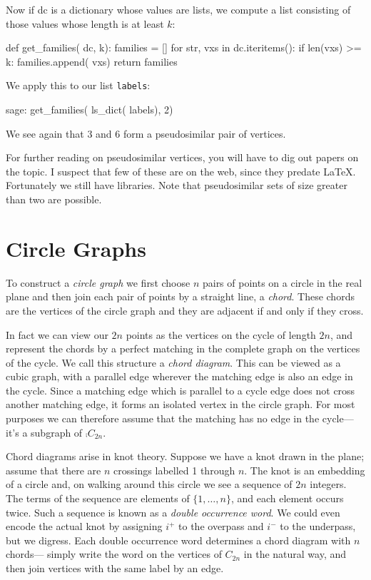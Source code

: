 Now if dc is a dictionary whose values are lists, we compute a list consisting
of those values whose length is at least $k$:
\begin{sageblock}
def get_families( dc, k):
    families = []
    for str, vxs in dc.iteritems():
        if len(vxs) >= k:
            families.append( vxs)
    return families
\end{sageblock}

We apply this to our list \texttt{labels}:
\begin{sageexample}
    sage: get_families( ls_dict( labels), 2)
\end{sageexample}

We see again that 3 and 6 form a pseudosimilar pair of vertices.

For further reading on pseudosimilar vertices, you will have to dig out papers
on the topic.  I suspect that few of these are on the web, since they
predate LaTeX.  Fortunately we still have libraries. Note that pseudosimilar
sets of size greater than two are possible.


\section{Circle Graphs}

To construct a \textsl{circle graph} we first choose $n$ pairs of points on a 
circle in the real plane and then join each pair of points by a straight line,
a \textsl{chord}. These chords are the vertices of the circle graph and they
are adjacent if and only if they cross.

In fact we can view our $2n$ points as the vertices on the cycle of length
$2n$, and represent the chords by a perfect matching in the complete graph
on the vertices of the cycle. We call this structure a \textsl{chord diagram}.
This can be viewed as a cubic graph, with a parallel edge wherever the matching
edge is also an edge in the cycle.
Since a matching edge which is parallel to a cycle edge does not cross
another matching edge, it forms an isolated vertex in the circle
graph. For most purposes we can therefore assume that the matching has
no edge in the cycle---it's a subgraph of $\comp{C_{2n}}$.

Chord diagrams arise in knot theory. Suppose we have a knot drawn in the
plane; assume that there are $n$ crossings labelled 1 through $n$. The knot is 
an embedding of a circle and, on walking around this circle we see a sequence
of $2n$ integers. The terms of the sequence are elements of $\{1,\ldots,n\}$,
and each element occurs twice. Such a sequence is known as a 
\textsl{double occurrence word}. We could even encode the actual knot by
assigning $i^+$ to the overpass and $i^-$ to the underpass, but we digress.
Each double occurrence word determines a chord diagram with $n$ chords---
simply write the word on the vertices of $C_{2n}$ in the natural way, and then
join vertices with the same label by an edge.

